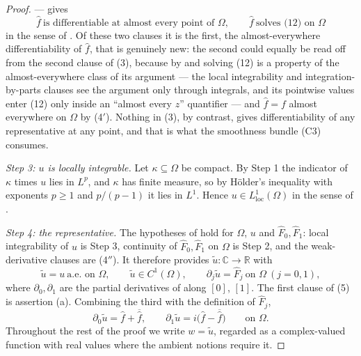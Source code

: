 \begin{proof}
--- gives
\begin{equation}\tag{4$'''$}
  \hat f\ \text{is differentiable at almost every point of }\Omega,\qquad
  \hat f\ \text{solves (12) on }\Omega
\end{equation}
in the sense of .  Of these two clauses it is the first,
the almost-everywhere differentiability of $\hat f$, that is genuinely new:
the second could equally be read off from the second clause of (3), because by
 and  solving (12) is a
property of the almost-everywhere class of its argument --- the local
integrability and integration-by-parts clauses see the argument only through
integrals, and its pointwise values enter (12) only inside an ``almost every
$z$'' quantifier --- and $\hat f=f$ almost everywhere on $\Omega$ by (4$'$).
Nothing in (3), by contrast, gives differentiability of any representative at
any point, and that is what the smoothness bundle (C3) consumes.

\emph{Step 3: $u$ is locally integrable.}  Let $\kappa\subseteq\Omega$ be
compact.  By Step 1 the indicator of $\kappa$ times $u$ lies in $L^{p}$, and
$\kappa$ has finite measure, so by H\"older's inequality with exponents $p\ge1$
and $p/(p-1)$ it lies in $L^{1}$.  Hence
$u\in L^{1}_{\mathrm{loc}}(\Omega)$ in the sense of .

\emph{Step 4: the representative.}  The hypotheses of
 hold for $\Omega$, $u$ and
$\hat F_0,\hat F_1$: local integrability of $u$ is Step 3, continuity of
$\hat F_0,\hat F_1$ on $\Omega$ is Step 2, and the weak-derivative clauses are
(4$''$).  It therefore provides
$\tilde u\colon\mathbb{C}\to\mathbb{R}$ with
\begin{equation}\tag{5}
  \tilde u=u\ \text{a.e. on }\Omega,\qquad
  \tilde u\in C^{1}(\Omega),\qquad
  \partial_j\tilde u=\hat F_j\ \text{on }\Omega\ (j=0,1),
\end{equation}
where $\partial_0,\partial_1$ are the partial derivatives of
 along $[0]$, $[1]$.  The first clause of (5) is
assertion (a).  Combining the third with the definition of $\hat F_j$,
\begin{equation}\tag{6}
  \partial_0\tilde u=\hat f+\overline{\hat f},\qquad
  \partial_1\tilde u=i\bigl(\hat f-\overline{\hat f}\bigr)
  \qquad\text{on }\Omega .
\end{equation}
Throughout the rest of the proof we write $w=\tilde u$, regarded as a
complex-valued function with real values where the ambient notions require it.


\end{proof}
